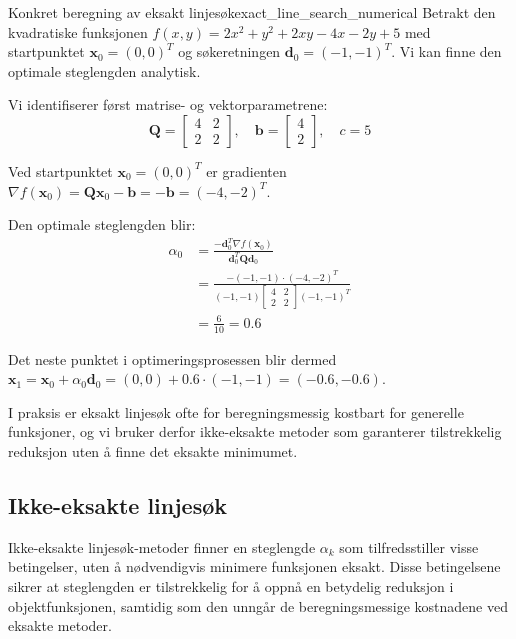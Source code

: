 \begin{example}{Konkret beregning av eksakt linjesøk}{exact_line_search_numerical}
	Betrakt den kvadratiske funksjonen $f(x,y) = 2x^2 + y^2 + 2xy - 4x - 2y + 5$ med startpunktet
	$\symbf{x}_0 = (0,0)^T$ og søkeretningen $\symbf{d}_0 = (-1,-1)^T$. Vi kan finne den optimale steglengden analytisk.

	Vi identifiserer først matrise- og vektorparametrene:
	\[
		\symbf{Q} = \begin{bmatrix} 4 & 2 \\ 2 & 2 \end{bmatrix}, \quad
		\symbf{b} = \begin{bmatrix} 4 \\ 2 \end{bmatrix}, \quad
		c = 5
	\]

	Ved startpunktet $\symbf{x}_0 = (0,0)^T$ er gradienten $\nabla f(\symbf{x}_0) = \symbf{Q}\symbf{x}_0 - \symbf{b} = -\symbf{b} = (-4,-2)^T$.

	Den optimale steglengden blir:
	\begin{align*}
		\alpha_0 & = \frac{-\symbf{d}_0^T\nabla f(\symbf{x}_0)}{\symbf{d}_0^T\symbf{Q}\symbf{d}_0}               \\
		         & = \frac{-(-1,-1)\cdot(-4,-2)^T}{(-1,-1)\begin{bmatrix} 4 & 2 \\ 2 & 2 \end{bmatrix}(-1,-1)^T} \\
		         & = \frac{6}{10} = 0.6
	\end{align*}

	Det neste punktet i optimeringsprosessen blir dermed
	$\symbf{x}_1 = \symbf{x}_0 + \alpha_0 \symbf{d}_0 = (0,0) + 0.6 \cdot (-1,-1) = (-0.6, -0.6)$.
\end{example}

I praksis er eksakt linjesøk ofte for beregningsmessig kostbart for generelle funksjoner, og vi bruker derfor ikke-eksakte metoder som garanterer tilstrekkelig reduksjon uten å finne det eksakte minimumet.

\subsection{Ikke-eksakte linjesøk}
\label{subsec:inexact_line_search}
Ikke-eksakte linjesøk-metoder finner en steglengde \(\alpha_k\) som tilfredsstiller visse betingelser, uten å nødvendigvis minimere funksjonen eksakt.
Disse betingelsene sikrer at steglengden er tilstrekkelig for å oppnå en betydelig reduksjon i objektfunksjonen, samtidig som den unngår de beregningsmessige kostnadene ved eksakte metoder.


